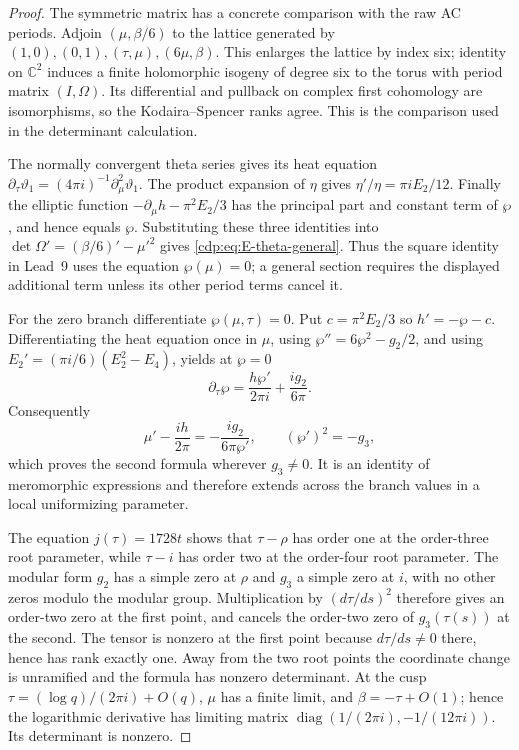 \begin{proof}
The symmetric matrix has a concrete comparison with the raw AC
periods. Adjoin $(\mu,\beta/6)$ to the lattice generated by
$(1,0),(0,1),(\tau,\mu),(6\mu,\beta)$. This enlarges the
lattice by index six; identity on $\mathbb C^2$ induces a finite
holomorphic isogeny of degree six to the torus with period matrix
$(I,\Omega)$. Its differential and pullback on complex first
cohomology are isomorphisms, so the Kodaira--Spencer ranks agree.
This is the comparison used in the determinant calculation.

The normally convergent theta series gives its heat equation
$\partial_\tau\vartheta_1=(4\pi i)^{-1}\partial_\mu^2\vartheta_1$.
The product expansion of $\eta$ gives
$\eta'/\eta=\pi i E_2/12$. Finally the elliptic function
$-\partial_\mu h-\pi^2E_2/3$ has the principal part and constant
term of $\wp$, and hence equals $\wp$. Substituting these three
identities into
$\det\Omega'=(\beta/6)'-\mu'^2$ gives
\eqref{cdp:eq:E-theta-general}. Thus the square identity in Lead~9
uses the equation $\wp(\mu)=0$; a general section requires the
displayed additional term unless its other period terms cancel it.

For the zero branch differentiate $\wp(\mu,\tau)=0$. Put
$c=\pi^2E_2/3$ so $h'=-\wp-c$. Differentiating the heat equation
once in $\mu$, using $\wp''=6\wp^2-g_2/2$, and using
$E_2'=(\pi i/6)(E_2^2-E_4)$, yields at $\wp=0$
\[
 \partial_\tau\wp=\frac{h\wp'}{2\pi i}
                       +\frac{i g_2}{6\pi}.
\]
Consequently
\[
 \mu'-\frac{i h}{2\pi}=-\frac{i g_2}{6\pi\wp'},
 \qquad (\wp')^2=-g_3,
\]
which proves the second formula wherever $g_3\ne0$. It is an
identity of meromorphic expressions and therefore extends across
the branch values in a local uniformizing parameter.

The equation $j(\tau)=1728t$ shows that $\tau-\rho$ has order one
at the order-three root parameter, while $\tau-i$ has order two
at the order-four root parameter. The modular form $g_2$ has a
simple zero at $\rho$ and $g_3$ a simple zero at $i$, with no
other zeros modulo the modular group. Multiplication by
$(d\tau/ds)^2$ therefore gives an order-two zero at the first
point, and cancels the order-two zero of $g_3(\tau(s))$ at the
second. The tensor is nonzero at the first point because
$d\tau/ds\ne0$ there, hence has rank exactly one. Away from the
two root points the coordinate change is unramified and the
formula has nonzero determinant. At the cusp
$\tau=(\log q)/(2\pi i)+O(q)$, $\mu$ has a finite limit, and
$\beta=-\tau+O(1)$; hence the logarithmic derivative has limiting
matrix $\operatorname{diag}(1/(2\pi i),-1/(12\pi i))$.
Its determinant is nonzero.
\end{proof}


